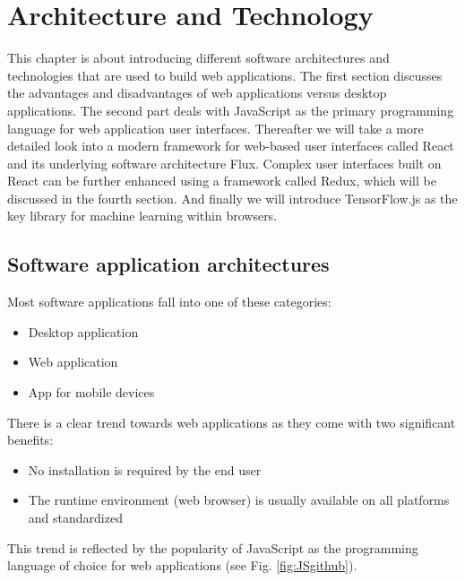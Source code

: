 \chapter{Architecture and Technology}

This chapter is about introducing different software architectures and 
technologies that are used to build web applications. 
The first section discusses the advantages and disadvantages of web
 applications versus desktop applications. The second part deals with
JavaScript as the primary programming language for web application user interfaces. 
Thereafter we will take a more detailed look into a modern framework for web-based user interfaces called React
and its underlying software architecture Flux.
Complex user interfaces built on React can be further enhanced using a framework called Redux, which will be discussed in the fourth section. And finally we will introduce TensorFlow.js as the key library for machine learning within browsers.   
   
  
\section{Software application architectures}
Most software applications fall into one of these
categories:

\begin{itemize}
	\item Desktop application
	\item Web application
	\item App for mobile devices
\end{itemize}

There is a clear trend towards web applications as they come
with two significant benefits:

\begin{itemize}
	\item No installation is required by the end user
	\item The runtime environment (web browser) is usually
	      available on all platforms and standardized
\end{itemize}

This trend is reflected by the popularity of JavaScript as 
the programming language of choice for web applications 
(see Fig. \ref{fig:JSgithub}).

